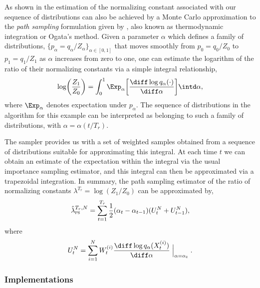 \documentclass[11pt, fontset=Minion, showoverfull,
bib, biblatexstyle=numeric, mintcode, minted=cache]{marticle}
\begin{document}
As shown in \cite{Zhou2013mc} the estimation of the normalizing constant
associated with our sequence of distributions can also be achieved by a Monte
Carlo approximation to the \emph{path sampling} formulation given by
\cite{Gelman:1998ei}, also known as thermodynamic integration or Ogata's
method. Given a parameter $\alpha$ which defines a family of distributions,
$\{p_{\alpha} = q_{\alpha} / Z_\alpha\}_{\alpha \in [0,1]}$ that moves
smoothly from $p_0 = q_0 / Z_0$ to $p_1 = q_1 / Z_1$ as $\alpha$ increases
from zero to one, one can estimate the logarithm of the ratio of their
normalizing constants via a simple integral relationship,
\begin{equation}
  \log\biggl( \frac{Z_1}{Z_0} \biggr) =
  \int_{0}^{1} \Exp_\alpha \biggl[ \rnd{\log q_{\alpha}(\cdot)}{\alpha}
  \biggr] \intd\alpha, \label{eq:path_identity}
\end{equation}
where $\Exp_\alpha$ denotes expectation under $p_\alpha$. The sequence of
distributions in the \smc algorithm for this example can be interpreted as
belonging to such a family of distributions, with $\alpha = \alpha(t/T_r)$.

The \smc sampler provides us with a set of weighted samples obtained from a
sequence of distributions suitable for approximating this integral. At each
time $t$ we can obtain an estimate of the expectation within the integral via
the usual importance sampling estimator, and this integral can then be
approximated via a trapezoidal integration. In summary, the path sampling
estimator of the ratio of normalizing constants $\lambda^{T_r} =
\log(Z_1/Z_0)$ can be approximated by,
\begin{equation}
  \hat\lambda_{\text{\textsc{ps}}}^{T_r,N} = \sum_{t=1}^{T_r}
  \frac{1}{2}(\alpha_t - \alpha_{t - 1})(U_t^N + U_{t-1}^N),
  \label{eq:path_est}
\end{equation}
where
\begin{equation}
  U_t^N = \sum_{i=1}^N
  W_t^{(i)} \rnd{\log q_{\alpha}(X_t^{(i)})}{\alpha}\Bigm|_{\alpha = \alpha_t}.
  \label{eq:path_import}
\end{equation}

\subsubsection{Implementations}
\end{document}
